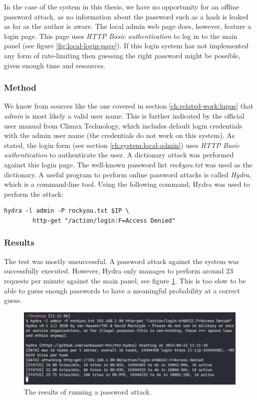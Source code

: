 In the case of the system in this thesis, we have no opportunity for an offline password attack, as no information about the password such as a hash is leaked as far as the author is aware. The local admin web page does, however, feature a login page. This page uses \textit{HTTP Basic authentication} to log in to the main panel (see figure \ref{fig:local-login-page}). If this login system has not implemented any form of rate-limiting then guessing the right password might be possible, given enough time and resources.

\subsubsection{Method}
We know from sources like the one covered in section \ref{ch:related-work:lupus} that \textit{admin} is most likely a valid user name. This is further indicated by the official user manual from Climax Technology, which includes default login credentials with the admin user name (the credentials do not work on this system). As stated, the login form (see section \ref{ch:system:local-admin}) uses \textit{HTTP Basic authentication} to authenticate the user. A dictionary attack was performed against this login page. The well-known password list \textit{rockyou.txt} was used as the dictionary. A useful program to perform online password attacks is called \textit{Hydra}, which is a command-line tool. Using the following command, Hydra was used to perform the attack:
\begin{lstlisting}[frame=tb]
    hydra -l admin -P rockyou.txt $IP \
        http-get "/action/login:F=Access Denied"
\end{lstlisting}

\subsubsection{Results}
The test was mostly unsuccessful. A password attack against the system was successfully executed. However, Hydra only manages to perform around 23 requests per minute against the main panel, see figure \ref{fig:hydra-password-attack}. This is too slow to be able to guess enough passwords to have a meaningful probability at a correct guess.
\begin{figure}[!ht]
    \centering
    \includegraphics[width=\textwidth]{images/6-pentesting/hydra-results.png}
    \caption{The results of running a password attack.}
    \label{fig:hydra-password-attack}
\end{figure}

